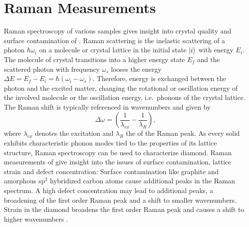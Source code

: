 
		\section{Raman Measurements} \label{sec::raman}

			Raman spectroscopy of various samples gives insight into crystal quality and surface contamination of \nds.
			Raman scattering is the inelastic scattering of a photon $\hbar\omega_i$ on a molecule or crystal lattice in the initial state $\ket{i}$ with energy $E_i$.
			The molecule of crystal transitions into a higher energy state $E_f$ and the scattered photon with frequency $\omega_s$ looses the energy $\Delta E = E_f - E_i = \hbar(\omega_i-\omega_s)$.
			Therefore, energy is exchanged between the photon and the excited matter, changing the rotational or oscillation energy of the involved molecule or the oscillation energy, i.e.\ phonons of the crystal lattice.
			The Raman shift is typically referenced in wavenumbers and given by
			\begin{equation}
				\Delta \omega = \left( \frac{1}{\lambda_{ex}}-\frac{1}{\lambda_R}\right) ,
			\end{equation}
			where $\lambda_{ex}$ denotes the excitation \wl and $\lambda_R$ the \cwl of the Raman peak.
			As every solid exhibits characteristic phonon modes tied to the properties of its lattice structure, Raman spectroscopy can be used to characterize diamond.
			Raman measurements of \nds give insight into the issues of surface contamination, lattice strain and defect concentration:
			Surface contamination like graphite and amorphous sp$^2$ hybridized carbon atoms cause additional peaks in the Raman spectrum.
			A high defect concentration may lead to additional peaks, a broadening of the first order Raman peak and a shift to smaller wavenumbers.
			Strain in the diamond broadens the first order Raman peak and causes a shift to higher wavenumbers \cite{Zaitsev2001,Prawer2004,Orwa2000}.
			

